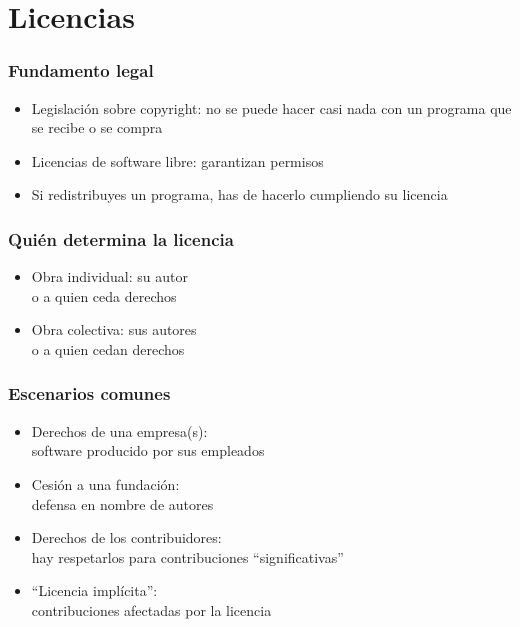 \documentclass[17pt,aspectratio=169]{beamer}
\begin{document}
\section{Licencias}


\begin{frame}
\frametitle{Fundamento legal}

\begin{itemize}
\item Legislación sobre copyright:
  no se puede hacer casi nada con un programa
  que se recibe o se compra
\item Licencias de software libre: garantizan permisos
\item Si redistribuyes un programa, has de hacerlo cumpliendo su licencia
\end{itemize}

\end{frame}


\begin{frame}
\frametitle{Quién determina la licencia}

\begin{itemize}
\item Obra individual: su autor \\
  o a quien ceda derechos
\item Obra colectiva: sus autores \\
  o a quien cedan derechos
\end{itemize}

\end{frame}


\begin{frame}
\frametitle{Escenarios comunes}

\begin{itemize}
\item Derechos de una empresa(s): \\
  software producido por sus empleados
\item Cesión a una fundación: \\
  defensa en nombre de autores
\item Derechos de los contribuidores: \\
  hay respetarlos para contribuciones ``significativas''
\item ``Licencia implícita'': \\
  contribuciones afectadas por la licencia
\end{itemize}

\end{frame}
\end{document}
